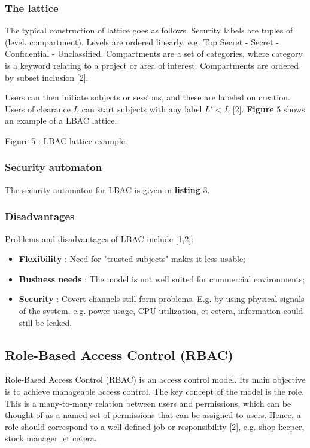 \subsubsection{The lattice}

The typical construction of lattice goes as follows. Security labels are tuples of (level, compartment). Levels are ordered linearly, e.g. Top Secret - Secret - Confidential - Unclassified. Compartments are a set of categories, where category is a keyword relating to a project or area of interest. Compartments are ordered by subset inclusion [2].

Users can then initiate subjects or sessions, and these are labeled on creation. Users of clearance $L$ can start subjects with any label $L' < L$ [2]. \textbf{Figure} 5 shows an example of a LBAC lattice.

Figure 5 : LBAC lattice example.


\subsubsection{Security automaton}

The security automaton for LBAC is given in \textbf{listing} 3.



\subsubsection{Disadvantages}

Problems and disadvantages of LBAC include [1,2]:
\begin{itemize}
	\item \textbf{Flexibility} : Need for "trusted subjects" makes it less usable;
	\item \textbf{Business needs} : The model is not well suited for commercial environments;
	\item \textbf{Security} : Covert channels still form problems. E.g. by using physical signals of the system, e.g. power usage, CPU utilization, et cetera, information could still be leaked.
\end{itemize}



\subsection{Role-Based Access Control (RBAC)}

Role-Based Access Control (RBAC) is an access control model. Its main objective is to achieve manageable access control. The key concept of the model is the role. This is a many-to-many relation between users and permissions, which can be thought of as a named set of permissions that can be assigned to users. Hence, a role should correspond to a well-defined job or responsibility [2], e.g. shop keeper, stock manager, et cetera.


